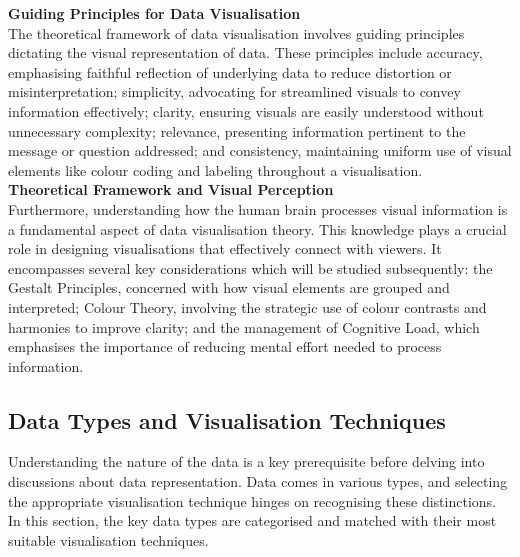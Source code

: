 \documentclass{article}\usepackage[]{graphicx}\usepackage[]{xcolor}
\numberwithin{equation}{section}
\begin{document}
\noindent \textbf{Guiding Principles for Data Visualisation}\\
The theoretical framework of data visualisation involves guiding principles dictating the visual representation of data. These principles include accuracy, emphasising faithful reflection of underlying data to reduce distortion or misinterpretation; simplicity, advocating for streamlined visuals to convey information effectively; clarity, ensuring visuals are easily understood without unnecessary complexity; relevance, presenting information pertinent to the message or question addressed; and consistency, maintaining uniform use of visual elements like colour coding and labeling throughout a visualisation.\\

\noindent \textbf{Theoretical Framework and Visual Perception}\\
Furthermore, understanding how the human brain processes visual information is a fundamental aspect of data visualisation theory. This knowledge plays a crucial role in designing visualisations that effectively connect with viewers. It encompasses several key considerations which will be studied subsequently: the Gestalt Principles, concerned with how visual elements are grouped and interpreted; Colour Theory, involving the strategic use of colour contrasts and harmonies to improve clarity; and the management of Cognitive Load, which emphasises the importance of reducing mental effort needed to process information.

\subsection{Data Types and Visualisation Techniques}
Understanding the nature of the data is a key prerequisite before delving into discussions about data representation. Data comes in various types, and selecting the appropriate visualisation technique hinges on recognising these distinctions. In this section, the key data types are categorised and matched with their most suitable visualisation techniques.
\end{document}
